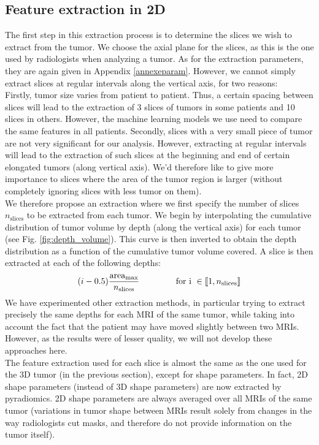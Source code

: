 \documentclass[preprint,12pt]{elsarticle}
\begin{document}
\subsection{Feature extraction in 2D}
\label{sec:2D}
\noindent The first step in this extraction process is to determine the slices we wish to extract from the tumor. We choose the axial plane for the slices, as this is the one used by radiologists when analyzing a tumor. As for the extraction parameters, they are again given in Appendix \ref{annexeparam}. However, we cannot simply extract slices at regular intervals along the vertical axis, for two reasons:\\
\indent Firstly, tumor size varies from patient to patient. Thus, a certain spacing between slices will lead to the extraction of 3 slices of tumors in some patients and 10 slices in others. However, the machine learning models we use need to compare the same features in all patients. Secondly, slices with a very small piece of tumor are not very significant for our analysis. However, extracting at regular intervals will lead to the extraction of such slices at the beginning and end of certain elongated tumors (along vertical axis). We'd therefore like to give more importance to slices where the area of the tumor region is larger (without completely ignoring slices with less tumor on them).\\
\indent We therefore propose an extraction where we first specify the number of slices $n_{\text{slices}}$ to be extracted from each tumor. We begin by interpolating the cumulative distribution of tumor volume by depth (along the vertical axis) for each tumor (see Fig. \ref{fig:depth_volume}). This curve is then inverted to obtain the depth distribution as a function of the cumulative tumor volume covered. A slice is then extracted at each of the following depths: 
\begin{equation}
(i-0.5) \displaystyle{\frac{\text{area}_{\text{max}}}{n_{\text{slices}}}} \hspace{1.5 cm} \text{for i } \in \llbracket 1,n_{\text{slices}}  \rrbracket
\end{equation}
We have experimented other extraction methods, in particular trying to extract precisely the same depths for each MRI of the same tumor, while taking into account the fact that the patient may have moved slightly between two MRIs. However, as the results were of lesser quality, we will not develop these approaches here.\\
\indent The feature extraction used for each slice is almost the same as the one used for the 3D tumor (in the previous section), except for shape parameters. In fact, 2D shape parameters (instead of 3D shape parameters) are now extracted by pyradiomics. 2D shape parameters are always averaged over all MRIs of the same tumor (variations in tumor shape between MRIs result solely from changes in the way radiologists cut masks, and therefore do not provide information on the tumor itself).\\
\end{document}
